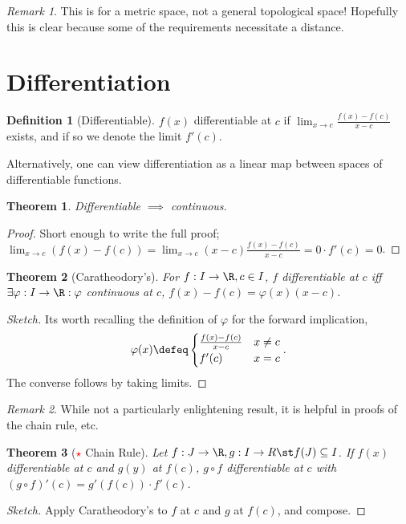 \documentclass[12pt, oneside]{article}
\newcommand*{\important}{\textcolor{red}{$\star$} }
\theoremstyle{definition}
\newtheorem{defn}{Definition}
\theoremstyle{plain}
\newtheorem{thm}{Theorem}
\theoremstyle{remark}
\newtheorem{remark}{Remark}
\let\origsection=\section
\renewcommand\section[1]{\origsection{#1}\label{sec:\thesection}}
\begin{document}
\begin{remark}
  This is for a metric space, not a general topological space! Hopefully this is clear because some of the requirements necessitate a distance.
\end{remark}


\section{Differentiation}
\begin{defn}[Differentiable]
  $f(x)$ differentiable at $c$ if $\lim_{x \to c} \frac{f(x) -f(c)}{x - c}$ exists, and if so we denote the limit $f'(c)$.

  Alternatively, one can view differentiation as a linear map between spaces of differentiable functions.
\end{defn}

\begin{thm}
  Differentiable $\implies$ continuous.
\end{thm}
\begin{proof}
  Short enough to write the full proof; $\lim_{x \to c} (f(x) - f(c)) = \lim_{x\to c} (x - c) \frac{f(x) - f(c)}{x-c} = 0 \cdot f'(c) = 0$.
\end{proof}

\begin{thm}[Caratheodory's]
  For $f : I \to \R, c \in I$, $f$ differentiable at $c$ iff $\exists \varphi : I \to \R : \varphi$ continuous at $c$, $f(x) - f(c) = \varphi(x) (x-c)$.
\end{thm}

\begin{proof}[Sketch]
  Its worth recalling the definition of $\varphi$ for the forward implication, $$\varphi(x) \defeq \begin{cases}
    \frac{f(x) - f(c)}{x - c} & x \neq c\\
    f'(c) & x = c
  \end{cases}.$$ The converse follows by taking limits.
\end{proof}

\begin{remark}
  While not a particularly enlightening result, it is helpful in proofs of the chain rule, etc.
\end{remark}

\begin{thm}[\important Chain Rule]
  Let $f : J \to \R, g : I \to R \st f(J) \subseteq I$. If $f(x)$ differentiable at $c$ and $g(y)$ at $f(c)$, $g \circ f$ differentiable at $c$ with $(g \circ f)'(c) = g'(f(c))\cdot f'(c)$.
\end{thm}
\begin{proof}[Sketch]
  Apply Caratheodory's to $f$ at $c$ and $g$ at $f(c)$, and compose.
\end{proof}
\end{document}
